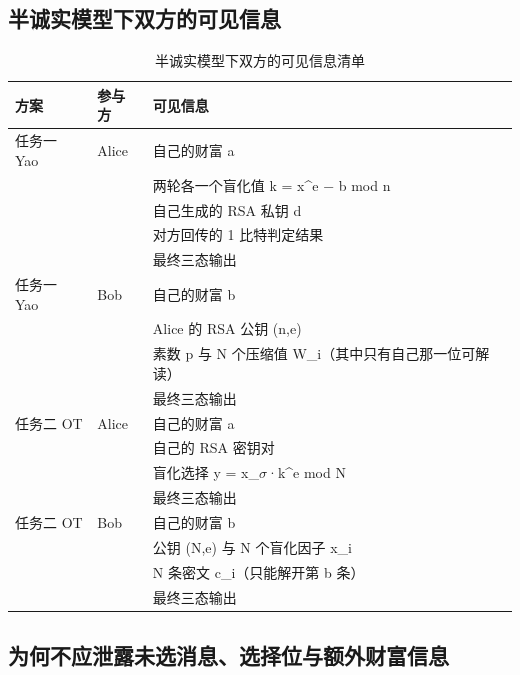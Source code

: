 \documentclass{SYSUReport}
\begin{document}
\subsection{半诚实模型下双方的可见信息}

\begin{table}[h]
\centering
\begin{tabular}{lll}
\toprule
方案 & 参与方 & 可见信息 \\
\midrule
任务一 Yao & Alice & 自己的财富 a \\
 &  & 两轮各一个盲化值 k = x\textasciicircum{}e − b mod n \\
 &  & 自己生成的 RSA 私钥 d \\
 &  & 对方回传的 1 比特判定结果 \\
 &  & 最终三态输出 \\
任务一 Yao & Bob & 自己的财富 b \\
 &  & Alice 的 RSA 公钥 (n,e) \\
 &  & 素数 p 与 N 个压缩值 W\_i（其中只有自己那一位可解读） \\
 &  & 最终三态输出 \\
任务二 OT & Alice & 自己的财富 a \\
 &  & 自己的 RSA 密钥对 \\
 &  & 盲化选择 y = x\_$\sigma$·k\textasciicircum{}e mod N \\
 &  & 最终三态输出 \\
任务二 OT & Bob & 自己的财富 b \\
 &  & 公钥 (N,e) 与 N 个盲化因子 x\_i \\
 &  & N 条密文 c\_i（只能解开第 b 条） \\
 &  & 最终三态输出 \\
\bottomrule
\end{tabular}
\caption{半诚实模型下双方的可见信息清单}
\label{tab:visible}
\end{table}

\subsection{为何不应泄露未选消息、选择位与额外财富信息}
\end{document}
